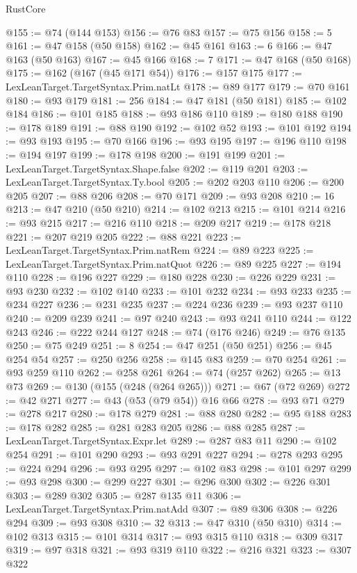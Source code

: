 \begin{lexlean}{RustCore}
\begin{coremodule}
@155 := @74 (@144 @153)
@156 := @76 @83
@157 := @75 @156
@158 := 5
@161 := @47 @158 (@50 @158)
@162 := @45 @161
@163 := 6
@166 := @47 @163 (@50 @163)
@167 := @45 @166
@168 := 7
@171 := @47 @168 (@50 @168)
@175 := @162 (@167 (@45 @171 @54))
@176 := @157 @175
@177 := LexLeanTarget.TargetSyntax.Prim.natLt
@178 := @89 @177
@179 := @70 @161
@180 := @93 @179
@181 := 256
@184 := @47 @181 (@50 @181)
@185 := @102 @184
@186 := @101 @185
@188 := @93 @186 @110
@189 := @180 @188
@190 := @178 @189
@191 := @88 @190
@192 := @102 @52
@193 := @101 @192
@194 := @93 @193
@195 := @70 @166
@196 := @93 @195
@197 := @196 @110
@198 := @194 @197
@199 := @178 @198
@200 := @191 @199
@201 := LexLeanTarget.TargetSyntax.Shape.false
@202 := @119 @201
@203 := LexLeanTarget.TargetSyntax.Ty.bool
@205 := @202 @203 @110
@206 := @200 @205
@207 := @88 @206
@208 := @70 @171
@209 := @93 @208
@210 := 16
@213 := @47 @210 (@50 @210)
@214 := @102 @213
@215 := @101 @214
@216 := @93 @215
@217 := @216 @110
@218 := @209 @217
@219 := @178 @218
@221 := @207 @219 @205
@222 := @88 @221
@223 := LexLeanTarget.TargetSyntax.Prim.natRem
@224 := @89 @223
@225 := LexLeanTarget.TargetSyntax.Prim.natQuot
@226 := @89 @225
@227 := @194 @110
@228 := @196 @227
@229 := @180 @228
@230 := @226 @229
@231 := @93 @230
@232 := @102 @140
@233 := @101 @232
@234 := @93 @233
@235 := @234 @227
@236 := @231 @235
@237 := @224 @236
@239 := @93 @237 @110
@240 := @209 @239
@241 := @97 @240
@243 := @93 @241 @110
@244 := @122 @243
@246 := @222 @244 @127
@248 := @74 (@176 @246)
@249 := @76 @135
@250 := @75 @249
@251 := 8
@254 := @47 @251 (@50 @251)
@256 := @45 @254 @54
@257 := @250 @256
@258 := @145 @83
@259 := @70 @254
@261 := @93 @259 @110
@262 := @258 @261
@264 := @74 (@257 @262)
@265 := @13 @73
@269 := @130 (@155 (@248 (@264 @265)))
@271 := @67 (@72 @269)
@272 := @42 @271
@277 := @43 (@53 (@79 @54)) @16 @66
@278 := @93 @71
@279 := @278 @217
@280 := @178 @279
@281 := @88 @280
@282 := @95 @188
@283 := @178 @282
@285 := @281 @283 @205
@286 := @88 @285
@287 := LexLeanTarget.TargetSyntax.Expr.let
@289 := @287 @83 @11
@290 := @102 @254
@291 := @101 @290
@293 := @93 @291 @227
@294 := @278 @293
@295 := @224 @294
@296 := @93 @295
@297 := @102 @83
@298 := @101 @297
@299 := @93 @298
@300 := @299 @227
@301 := @296 @300
@302 := @226 @301
@303 := @289 @302
@305 := @287 @135 @11
@306 := LexLeanTarget.TargetSyntax.Prim.natAdd
@307 := @89 @306
@308 := @226 @294
@309 := @93 @308
@310 := 32
@313 := @47 @310 (@50 @310)
@314 := @102 @313
@315 := @101 @314
@317 := @93 @315 @110
@318 := @309 @317
@319 := @97 @318
@321 := @93 @319 @110
@322 := @216 @321
@323 := @307 @322

\end{coremodule}
\end{lexlean}
